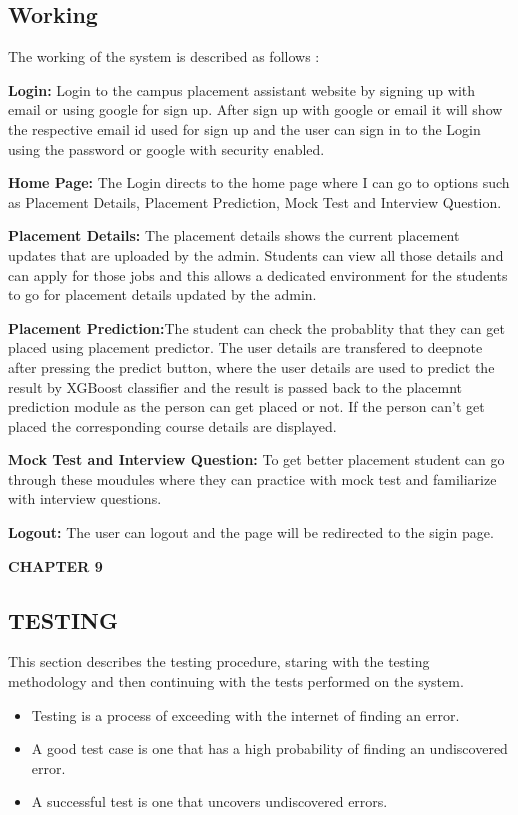 \documentclass[12pt]{article}
\begin{document}
\subsection{Working}
The working of the system is described as follows :
\begin{steps}
  \item \textbf{Login:} Login to the campus placement assistant website by signing up with email or using google for sign up. After sign up with google or email it will show the respective email id used for sign up and the user can sign in to the Login using the password or google with security enabled.
  \item \textbf{Home Page:} The Login directs to the home page where I can go to options such as Placement Details, Placement Prediction, Mock Test and Interview Question.
\item \textbf{Placement Details:} The placement details shows the current placement updates that are uploaded by the admin. Students can view all those details and can apply for those jobs and this allows a dedicated environment for the students to go for placement details updated by the admin.
\item \textbf{Placement Prediction:}The student can check the probablity that they can get placed using placement predictor. The user details are transfered to deepnote after pressing the predict button, where the user details are used to predict the result by XGBoost classifier and the result is passed back to the placemnt prediction module as the person can get placed or not. If the person can't get placed the corresponding course details are displayed.
\item \textbf{Mock Test and Interview Question:} To get better placement student can go through these moudules where they can practice with mock test and familiarize with interview questions.
\item \textbf{Logout:} The user can logout and the page will be redirected to the sigin page.
\end{steps}

\newpage
\begin{flushleft}\textbf{CHAPTER 9} \end{flushleft}
\begin{flushleft}\section{TESTING} \end{flushleft}
\vspace*{10px}
This section describes the testing procedure, staring with the testing methodology
and then continuing with the tests performed on the system.
\begin{itemize}
\item Testing is a process of exceeding with the internet of finding an error.
\item A good test case is one that has a high probability of finding an undiscovered error.
\item A successful test is one that uncovers undiscovered errors.
\end{itemize}
\end{document}
